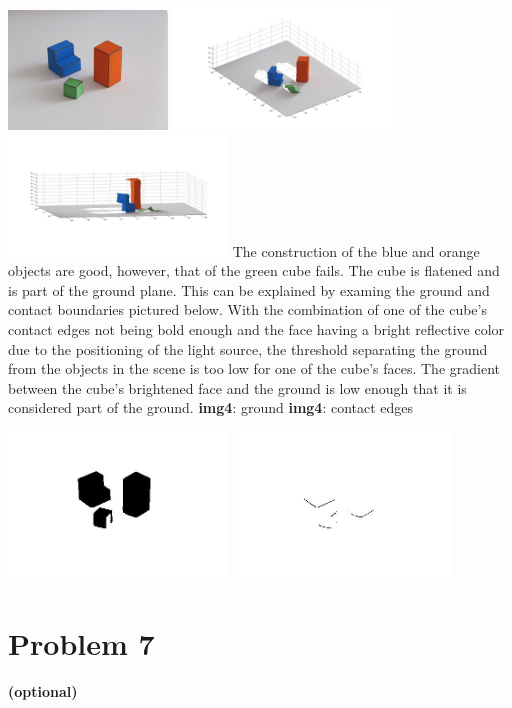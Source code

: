\documentclass[12pt,twoside]{article}
\newcommand{\tabUnit}{3ex}
\newcommand{\tabT}{\hspace*{\tabUnit}}
\begin{document}
\includegraphics[width = 120pt]{img4}
\includegraphics[width = 165pt]{img4_cv1}
\includegraphics[width = 165pt]{img4_cv2}
\newline
\newline
The construction of the blue and orange objects are good, however, that of the green cube fails.  The cube is flatened and is part of the ground plane.  This can be explained by examing the ground and contact boundaries pictured below.  With the combination of one of the cube's contact edges not being bold enough and the face having a bright reflective color due to the positioning of the light source, the threshold separating the ground from the objects in the scene is too low for one of the cube's faces. The gradient between the cube's brightened face and the ground is low enough that it is considered part of the ground.
\newline
\newline
\tabT\tabT\tabT\tabT\tabT \textbf{img4}: ground
\tabT\tabT\tabT\tabT\tabT \textbf{img4}: contact edges 
\newline

\tabT\tabT
\includegraphics[width = 165pt]{img4_g}
\includegraphics[width = 165pt]{img4_ce}

\section*{Problem 7}
\tabT \textbf{(optional)}
\end{document}

